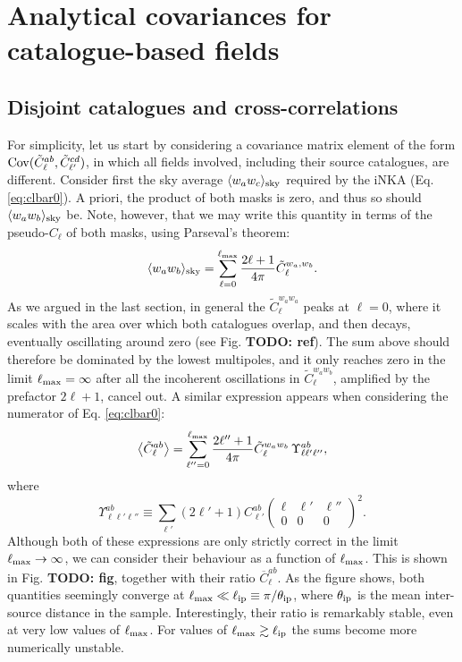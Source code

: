 \documentclass[aps,twocolumn, superscriptaddress, english, nofootinbib, 10pt]{revtex4-2}
\newcommand{\wtj}[6]{\left(\begin{array}{ccc} #1 & #2 & #3\\#4 & #5 & #6\end{array} \right)}
\newcommand{\todo}[1]{{\color{blue}\bf TODO: #1}}
\begin{document}
\section{Analytical covariances for catalogue-based fields}\label{sec:theo}
  \subsection{Disjoint catalogues and cross-correlations}\label{ssec:theo.alldiff}
    For simplicity, let us start by considering a covariance matrix element of the form ${\rm Cov}(\tilde{C}^{ab}_\ell,\tilde{C}^{cd}_{\ell'})$, in which all fields involved, including their source catalogues, are different. Consider first the sky average $\langle w_aw_c\rangle_{\rm sky}$ required by the iNKA (Eq. \ref{eq:clbar0}). A priori, the product of both masks is zero, and thus so should $\langle w_aw_b\rangle_{\rm sky}$ be. Note, however, that we may write this quantity in terms of the pseudo-$C_\ell$ of both masks, using Parseval's theorem:
    \begin{equation}
      \langle w_aw_b\rangle_{\rm sky}=\sum_{\ell=0}^{\ell_{\rm max}}\frac{2\ell+1}{4\pi}\tilde{C}^{w_a,w_b}_\ell.
    \end{equation}
    As we argued in the last section, in general the $\tilde{C}^{w_aw_a}_\ell$ peaks at $\ell=0$, where it scales with the area over which both catalogues overlap, and then decays, eventually oscillating around zero (see Fig. \todo{ref}). The sum above should therefore be dominated by the lowest multipoles, and it only reaches zero in the limit $\ell_{\rm max}=\infty$ after all the incoherent oscillations in $\tilde{C}^{w_aw_b}_\ell$, amplified by the prefactor $2\ell+1$, cancel out. A similar expression appears when considering the numerator of Eq. \ref{eq:clbar0}:
    \begin{equation}
      \left\langle\tilde{C}^{ab}_\ell\right\rangle=\sum_{\ell''=0}^{\ell_{\rm max}}\frac{2\ell''+1}{4\pi}\tilde{C}^{w_aw_b}_\ell\,\Upsilon^{ab}_{\ell\ell'\ell''},
    \end{equation}
    where
    \begin{equation}
      \Upsilon^{ab}_{\ell\ell'\ell''}\equiv\sum_{\ell'}(2\ell'+1)C^{ab}_{\ell'}\wtj{\ell}{\ell'}{\ell''}{0}{0}{0}^2.
    \end{equation}
    Although both of these expressions are only strictly correct in the limit $\ell_{\rm max}\rightarrow\infty$, we can consider their behaviour as a function of $\ell_{\rm max}$. This is shown in Fig. \todo{fig}, together with their ratio $\overline{C}^{ab}_\ell$. As the figure shows, both quantities seemingly converge at $\ell_{\rm max}\ll\ell_{\rm ip}\equiv\pi/\theta_{\rm ip}$, where $\theta_{\rm ip}$ is the mean inter-source distance in the sample. Interestingly, their ratio is remarkably stable, even at very low values of $\ell_{\rm max}$. For values of $\ell_{\rm max}\gtrsim\ell_{\rm ip}$ the sums become more numerically unstable.
\end{document}
